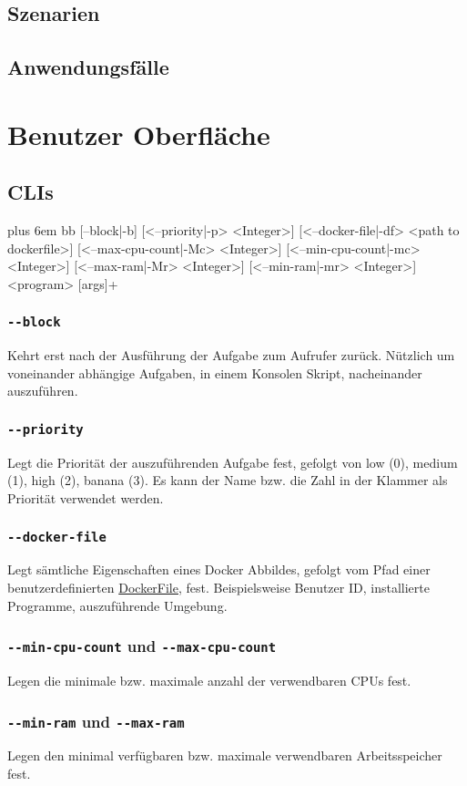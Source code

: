 \documentclass[parskip=full]{scrartcl}
\makeatletter
\newenvironment{mycode}
 {\def\@xobeysp{\ }\verbatim\rightskip=0pt plus 6em\relax}
 {\endverbatim}
\makeatother
\begin{document}
\subsection{Szenarien}

\subsection{Anwendungsfälle}

\section{Benutzer Oberfläche}
\subsection{\glspl{CLI}}
\begin{mycode}
bb [--block|-b] [<--priority|-p> <Integer>] [<--docker-file|-df> <path to dockerfile>] [<--max-cpu-count|-Mc> <Integer>] [<--min-cpu-count|-mc> <Integer>] [<--max-ram|-Mr> <Integer>] [<--min-ram|-mr> <Integer>] <program> [args]+
\end{mycode}

\subsubsection{\texttt{-{}-block}}
Kehrt erst nach der Ausführung der Aufgabe zum Aufrufer zurück. Nützlich um voneinander abhängige Aufgaben, in einem Konsolen Skript, nacheinander auszuführen.

\subsubsection{\texttt{-{}-priority}}
Legt die Priorität der auszuführenden Aufgabe fest, gefolgt von low (0), medium (1), high (2), banana (3).
Es kann der Name bzw. die Zahl in der Klammer als Priorität verwendet werden.

\subsubsection{\texttt{-{}-docker-file}}
Legt sämtliche Eigenschaften eines Docker Abbildes, gefolgt vom Pfad einer benutzerdefinierten \href{https://docs.docker.com/engine/reference/builder/}{DockerFile}, fest.
Beispielsweise Benutzer ID, installierte Programme, auszuführende Umgebung.

\subsubsection{\texttt{-{}-min-cpu-count} und \texttt{-{}-max-cpu-count}}
Legen die minimale bzw. maximale anzahl der verwendbaren \glspl{CPU} fest.

\subsubsection{\texttt{-{}-min-ram} und \texttt{-{}-max-ram}}
Legen den minimal verfügbaren bzw. maximale verwendbaren Arbeitsspeicher fest.

\printnoidxglossaries
\end{document}
